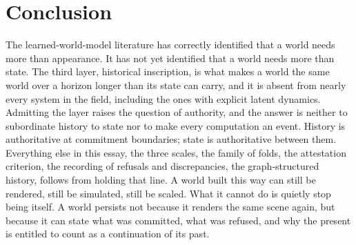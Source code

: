 \documentclass[11pt]{article}
\begin{document}
\section{Conclusion}

The learned-world-model literature has correctly identified that a world needs more than appearance. It has not yet identified that a world needs more than state. The third layer, historical inscription, is what makes a world the same world over a horizon longer than its state can carry, and it is absent from nearly every system in the field, including the ones with explicit latent dynamics. Admitting the layer raises the question of authority, and the answer is neither to subordinate history to state nor to make every computation an event. History is authoritative at commitment boundaries; state is authoritative between them. Everything else in this essay, the three scales, the family of folds, the attestation criterion, the recording of refusals and discrepancies, the graph-structured history, follows from holding that line. A world built this way can still be rendered, still be simulated, still be scaled. What it cannot do is quietly stop being itself. A world persists not because it renders the same scene again, but because it can state what was committed, what was refused, and why the present is entitled to count as a continuation of its past.
\end{document}

